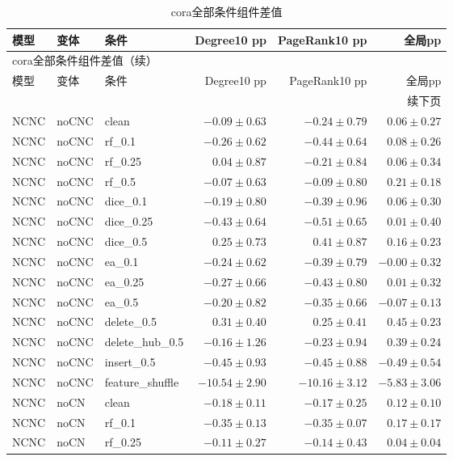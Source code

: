 \documentclass[UTF8,a4paper,11pt,fontset=fandol]{ctexart}
\begin{document}
{\footnotesize
\setlength{\tabcolsep}{3pt}
\begin{longtable}{lllrrr}
\caption{cora全部条件组件差值}\\
\toprule
模型 & 变体 & 条件 & Degree10 pp & PageRank10 pp & 全局pp \\
\midrule
\endfirsthead
\multicolumn{6}{l}{cora全部条件组件差值（续）}\\
\toprule
模型 & 变体 & 条件 & Degree10 pp & PageRank10 pp & 全局pp \\
\midrule
\endhead
\midrule\multicolumn{6}{r}{续下页}\\
\endfoot
\bottomrule\endlastfoot
NCNC & noCNC & clean & $-0.09\pm0.63$ & $-0.24\pm0.79$ & $0.06\pm0.27$ \\
NCNC & noCNC & rf\_0.1 & $-0.26\pm0.62$ & $-0.44\pm0.64$ & $0.08\pm0.26$ \\
NCNC & noCNC & rf\_0.25 & $0.04\pm0.87$ & $-0.21\pm0.84$ & $0.06\pm0.34$ \\
NCNC & noCNC & rf\_0.5 & $-0.07\pm0.63$ & $-0.09\pm0.80$ & $0.21\pm0.18$ \\
NCNC & noCNC & dice\_0.1 & $-0.19\pm0.80$ & $-0.39\pm0.96$ & $0.06\pm0.30$ \\
NCNC & noCNC & dice\_0.25 & $-0.43\pm0.64$ & $-0.51\pm0.65$ & $0.01\pm0.40$ \\
NCNC & noCNC & dice\_0.5 & $0.25\pm0.73$ & $0.41\pm0.87$ & $0.16\pm0.23$ \\
NCNC & noCNC & ea\_0.1 & $-0.24\pm0.62$ & $-0.39\pm0.79$ & $-0.00\pm0.32$ \\
NCNC & noCNC & ea\_0.25 & $-0.27\pm0.66$ & $-0.43\pm0.80$ & $0.01\pm0.32$ \\
NCNC & noCNC & ea\_0.5 & $-0.20\pm0.82$ & $-0.35\pm0.66$ & $-0.07\pm0.13$ \\
NCNC & noCNC & delete\_0.5 & $0.31\pm0.40$ & $0.25\pm0.41$ & $0.45\pm0.23$ \\
NCNC & noCNC & delete\_hub\_0.5 & $-0.16\pm1.26$ & $-0.23\pm0.94$ & $0.39\pm0.24$ \\
NCNC & noCNC & insert\_0.5 & $-0.45\pm0.93$ & $-0.45\pm0.88$ & $-0.49\pm0.54$ \\
NCNC & noCNC & feature\_shuffle & $-10.54\pm2.90$ & $-10.16\pm3.12$ & $-5.83\pm3.06$ \\
NCNC & noCN & clean & $-0.18\pm0.11$ & $-0.17\pm0.25$ & $0.12\pm0.10$ \\
NCNC & noCN & rf\_0.1 & $-0.35\pm0.13$ & $-0.35\pm0.07$ & $0.17\pm0.17$ \\
NCNC & noCN & rf\_0.25 & $-0.11\pm0.27$ & $-0.14\pm0.43$ & $0.04\pm0.04$ \\

\end{longtable}}
\end{document}
